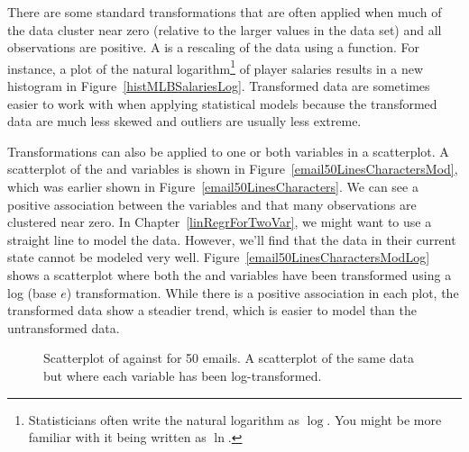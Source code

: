 There are some standard transformations that are often applied when much of the data cluster near zero (relative to the larger values in the data set) and all observations are positive. A  is a rescaling of the data using a function. For instance, a plot of the natural logarithm\footnote{Statisticians often write the natural logarithm as $\log$. You might be more familiar with it being written as $\ln$.} of player salaries results in a new histogram in Figure~\ref{histMLBSalariesLog}. Transformed data are sometimes easier to work with when applying statistical models because the transformed data are much less skewed and outliers are usually less extreme.

Transformations can also be applied to one or both variables in a scatterplot. A scatterplot of the  and  variables is shown in Figure~\ref{email50LinesCharactersMod}, which was earlier shown in Figure~\ref{email50LinesCharacters}. We can see a positive association between the variables and that many observations are clustered near zero. In Chapter~\ref{linRegrForTwoVar}, we might want to use a straight line to model the data. However, we'll find that the data in their current state cannot be modeled very well. Figure~\ref{email50LinesCharactersModLog} shows a scatterplot where both the  and  variables have been transformed using a log (base $e$) transformation. While there is a positive association in each plot, the transformed data show a steadier trend, which is easier to model than the untransformed data.

\begin{figure}
\centering
{}
\caption{ Scatterplot of  against  for 50 emails.  A scatterplot of the same data but where each variable has been log-transformed.}
\label{email50LinesCharactersModMain}
\end{figure}

